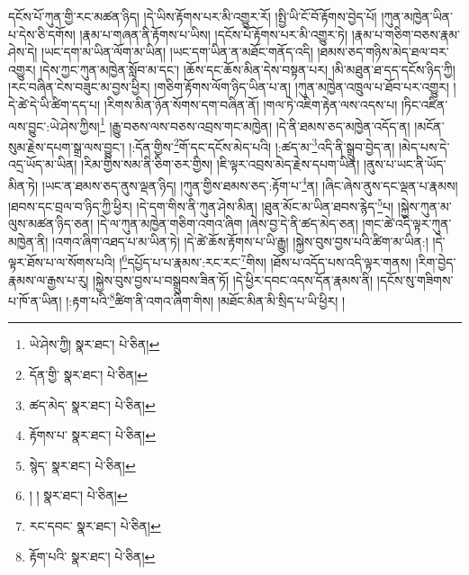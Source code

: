དངོས་པོ་ཀུན་གྱི་རང་མཚན་ཉིད། །དེ་ཡིས་རྟོགས་པར་མི་འགྱུར་རོ། །སྤྱི་ཡི་ངོ་བོ་རྟོགས་བྱེད་པོ། །ཀུན་མཁྱེན་ཡིན་པ་དེས་ཅི་དགོས། །རྣམ་པ་གཞན་ནི་རྟོགས་པ་ཡིས། །དངོས་པོ་རྟོགས་པར་མི་འགྱུར་ཏེ། །རྣམ་པ་གཅིག་བཅས་རྣམ་ཤེས་དེ། །ཡང་དག་མ་ཡིན་ལོག་མ་ཡིན། །ཡང་དག་ཡིན་ན་མཐོང་གནོད་འདི། །ཐམས་ཅད་གཉིས་མེད་ཐལ་བར་འགྱུར། །དེས་ཀྱང་ཀུན་མཁྱེན་སློབ་མ་དང་། །ཆོས་དང་ཆོས་མིན་དེས་བསྟན་པར། །མི་མཐུན་ཐ་དད་དངོས་ཉིད་ཀྱི། །རང་བཞིན་ངེས་བཟུང་མ་བྱས་ཕྱིར། །གཅིག་རྟོགས་ལོག་ཉིད་ཡིན་པ་ན། །ཀུན་མཁྱེན་འཁྲུལ་པ་ཐོབ་པར་འགྱུར། །དེ་ཚེ་དེ་ཡི་ཚིག་དད་པ། །རིགས་མིན་ཉོན་སོགས་དག་བཞིན་ནོ། །གལ་ཏེ་འཇིག་རྟེན་ལས་འདས་པ། །ཏིང་འཛིན་ལས་བྱུང་:ཡེ་ཤེས་ཀྱིས།\footnote{ཡེ་ཤེས་ཀྱི།  སྣར་ཐང་།  པེ་ཅིན། } །རྒྱུ་བཅས་ལས་བཅས་འབྲས་གང་མཁྱེན། །དེ་ནི་ཐམས་ཅད་མཁྱེན་འདོད་ན། །མངོན་སུམ་རྗེས་དཔག་སྒྲ་ལས་བྱུང་། །:དོན་གྱིས་\footnote{དོན་གྱི་  སྣར་ཐང་།  པེ་ཅིན། }གོ་དང་དངོས་མེད་པའི། །:ཚད་མ་\footnote{ཚད་མེད་  སྣར་ཐང་།  པེ་ཅིན། }འདི་ནི་སྒྲུབ་བྱེད་ན། །མེད་པས་དེ་འདྲ་ཡོད་མ་ཡིན། །རིམ་གྱིས་སམ་ནི་ཅིག་ཅར་གྱིས། །ཇི་ལྟར་འབྲས་མེད་རྗེས་དཔག་ཡིན། །ནུས་པ་ཡང་ནི་ཡོད་མིན་ཏེ། །ཡང་ན་ཐམས་ཅད་ནུས་ལྡན་ཉིད། །ཀུན་གྱིས་ཐམས་ཅད་:རྟོག་པ་\footnote{རྟོགས་པ་  སྣར་ཐང་།  པེ་ཅིན། }ན། །ཞིང་ཞེས་ནུས་དང་ལྡན་པ་རྣམས། །ཐབས་དང་བྲལ་བ་ཉིད་ཀྱི་ཕྱིར། །དེ་དག་གིས་ནི་ཀུན་ཤེས་མིན། །ཐུན་མོང་མ་ཡིན་ཐབས་རྙེད་\footnote{སྙེད་  སྣར་ཐང་།  པེ་ཅིན། }པ། །སྐྱེས་ཀུན་མ་ལུས་མཚན་ཉིད་ཅན། །དེ་ལ་ཀུན་མཁྱེན་གཅིག་འགའ་ཞིག །ཞེས་བྱ་དེ་ནི་ཚད་མེད་ཅན། །གང་ཚེ་འདི་ལྟར་ཀུན་མཁྱེན་ནི། །འགའ་ཞིག་འཐད་པ་མ་ཡིན་ཏེ། །དེ་ཚེ་ཆོས་རྟོགས་པ་ཡི་རྒྱུ། །སྐྱེས་བུས་བྱས་པའི་ཚིག་མ་ཡིན:། །དེ་ལྟར་ཐོས་པ་ལ་སོགས་པའི། །\footnote{། །  སྣར་ཐང་།  པེ་ཅིན། }དཔྱོད་པ་པ་རྣམས་:རང་རང་\footnote{རང་དབང་  སྣར་ཐང་།  པེ་ཅིན། }གིས། །ཐོས་པ་འདོད་པས་འདི་ལྟར་གནས། །རིག་བྱེད་རྣམས་ལ་རྒྱས་པ་རུ། །སྐྱེས་བུས་བྱས་པ་བསྒྲུབས་ཟིན་ཏོ། །དེ་ཕྱིར་དབང་འདས་དོན་རྣམས་ནི། །དངོས་སུ་གཟིགས་པ་ཁོ་ན་ཡིན། །:རྟག་པའི་\footnote{རྟོག་པའི་  སྣར་ཐང་།  པེ་ཅིན། }ཚིག་ནི་འགའ་ཞིག་གིས། །མཐོང་མིན་མི་སྲིད་པ་ཡི་ཕྱིར། །
